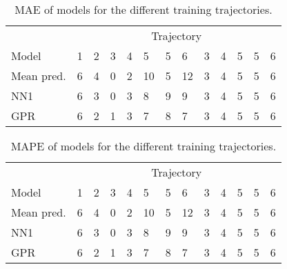 \begin{table}[H]
  \centering
  \caption{MAE of models for the different training trajectories.}
  \label{tbl:model-mae-of-trajs}
  \begin{tabular}{ l | l | l | l | l | l | l | l | l | l | l | l | l }
    & \multicolumn{12}{c}{Trajectory} \\
    Model       & 1 & 2 & 3 & 4 & 5  & 5 & 6 & 3 & 4 & 5  & 5 & 6 \\
    \hline
    Mean pred.  & 6 & 4 & 0 & 2 & 10 & 5 & 12 & 3 & 4 & 5  & 5 & 6 \\
    NN1         & 6 & 3 & 0 & 3 &  8 & 9 &  9 & 3 & 4 & 5  & 5 & 6 \\
    GPR         & 6 & 2 & 1 & 3 &  7 & 8 &  7 & 3 & 4 & 5  & 5 & 6 \\
  \end{tabular}
\end{table}

\begin{table}[H]
  \centering
  \caption{MAPE of models for the different training trajectories.}
  \label{fig:model-mape-of-trajs}
  \begin{tabular}{l | l | l | l | l | l | l | l | l | l | l | l | l }
    & \multicolumn{12}{c}{Trajectory} \\
    Model        & 1 & 2 & 3 & 4 & 5  & 5 & 6 & 3 & 4 & 5  & 5 & 6 \\
    \hline
    Mean pred.  & 6 & 4 & 0 & 2 & 10 & 5 & 12 & 3 & 4 & 5  & 5 & 6 \\
    NN1         & 6 & 3 & 0 & 3 &  8 & 9 &  9 & 3 & 4 & 5  & 5 & 6 \\
    GPR         & 6 & 2 & 1 & 3 &  7 & 8 &  7 & 3 & 4 & 5  & 5 & 6 \\
  \end{tabular}
\end{table}





